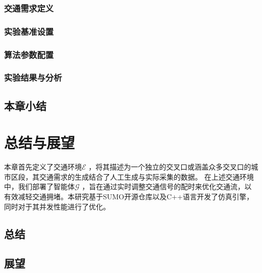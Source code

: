 \subsection{交通需求定义}
\subsection{实验基准设置}
\subsection{算法参数配置}
\subsection{实验结果与分析}

\section{本章小结}


\chapter{总结与展望}
本章首先定义了交通环境$\mathcal{E}$ ，将其描述为一个独立的交叉口或涵盖众多交叉口的城市区段，其交通需求的生成结合了人工生成与实际采集的数据。
在上述交通环境中，我们部署了智能体$\mathcal{G}$ ，旨在通过实时调整交通信号的配时来优化交通流，以有效减轻交通拥堵。本研究基于SUMO开源仓库以及C++语言开发了仿真引擎，同时对于其并发性能进行了优化。
\section{总结}
\section{展望}

